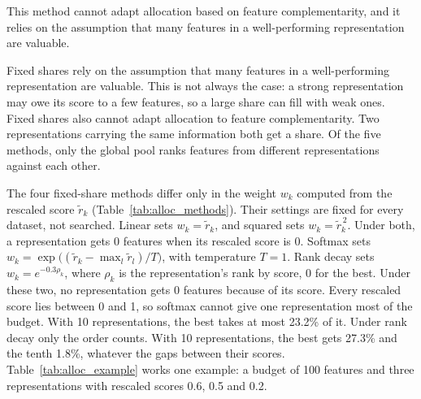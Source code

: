 This method cannot adapt allocation based on feature complementarity, and it relies on the assumption that many features in a well-performing representation are valuable.

Fixed shares rely on the assumption that many features in a well-performing representation are valuable. This is not always the case: a strong representation may owe its score to a few features, so a large share can fill with weak ones. Fixed shares also cannot adapt allocation to feature complementarity. Two representations carrying the same information both get a share. Of the five methods, only the global pool ranks features from different representations against each other.


The four fixed-share methods differ only in the weight $w_k$ computed from the rescaled score $\tilde r_k$ (Table~\ref{tab:alloc_methods}). Their settings are fixed for every dataset, not searched. Linear sets $w_k = \tilde r_k$, and squared sets $w_k = \tilde r_k^{\,2}$. Under both, a representation gets 0 features when its rescaled score is 0. Softmax sets $w_k = \exp\big((\tilde r_k - \max_l \tilde r_l)/T\big)$, with temperature $T = 1$. Rank decay sets $w_k = e^{-0.3\rho_k}$, where $\rho_k$ is the representation's rank by score, 0 for the best. Under these two, no representation gets 0 features because of its score. Every rescaled score lies between 0 and 1, so softmax cannot give one representation most of the budget. With 10 representations, the best takes at most 23.2\% of it. Under rank decay only the order counts. With 10 representations, the best gets 27.3\% and the tenth 1.8\%, whatever the gaps between their scores. Table~\ref{tab:alloc_example} works one example: a budget of 100 features and three representations with rescaled scores 0.6, 0.5 and 0.2.

